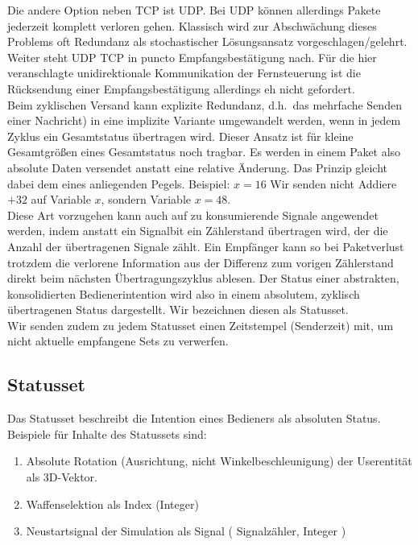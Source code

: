 Die andere Option neben TCP ist UDP. Bei UDP können allerdings Pakete jederzeit komplett verloren gehen.
Klassisch wird zur Abschwächung dieses Problems oft Redundanz als stochastischer Lösungsansatz vorgeschlagen/gelehrt.
Weiter steht UDP TCP in puncto Empfangsbestätigung nach. Für die hier veranschlagte unidirektionale Kommunikation der Fernsteuerung ist die Rücksendung einer Empfangsbestätigung allerdings eh nicht gefordert.\\

Beim zyklischen Versand kann explizite Redundanz, d.h.~das mehrfache Senden einer Nachricht) in eine implizite Variante umgewandelt werden, wenn in jedem Zyklus ein Gesamtstatus übertragen wird.
Dieser Ansatz ist für kleine Gesamtgrößen eines Gesamtstatus noch tragbar.
Es werden in einem Paket also absolute Daten versendet anstatt eine relative Änderung. Das Prinzip gleicht dabei dem eines anliegenden Pegels. Beispiel:
$x = 16$ Wir senden nicht \glqq Addiere $+32$ auf Variable $x$\grqq , sondern \glqq Variable $x = 48$\grqq .\\
Diese Art vorzugehen kann auch auf zu konsumierende Signale angewendet werden, indem anstatt ein Signalbit ein Zählerstand übertragen wird, der die Anzahl der übertragenen Signale zählt. Ein Empfänger kann so bei Paketverlust trotzdem die verlorene Information aus der Differenz zum vorigen Zählerstand direkt beim nächsten Übertragungszyklus ablesen.
Der Status einer abstrakten, konsolidierten Bedienerintention wird also in einem absolutem, zyklisch übertragenen Status dargestellt. Wir bezeichnen diesen als Statusset.\\
Wir senden zudem zu jedem Statusset einen Zeitstempel (Senderzeit) mit, um nicht aktuelle empfangene Sets zu verwerfen.

\subsection{Statusset}
Das Statusset beschreibt die Intention eines Bedieners als absoluten Status.
Beispiele für Inhalte des Statussets sind:
\begin{enumerate}
\item Absolute Rotation (Ausrichtung, nicht Winkelbeschleunigung) der Userentität als 3D-Vektor.
\item Waffenselektion als Index (Integer)
\item Neustartsignal der Simulation als Signal ( Signalzähler, Integer )
\end{enumerate}

